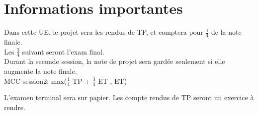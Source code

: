 \section{Informations importantes}
Dans cette UE, le projet sera les rendus de TP, et comptera pour $\frac{1}{4}$ de la note finale.\\
Les $\frac{3}{4}$ suivant seront l'exam final.\\
Durant la seconde session, la note de projet sera gardée seulement si elle augmente la note finale.\\
MCC session2: max($\frac{1}{4}$ TP + $\frac{3}{4}$ ET , ET)

L'examen terminal sera sur papier. Les compte rendus de TP seront un exercice à rendre.
